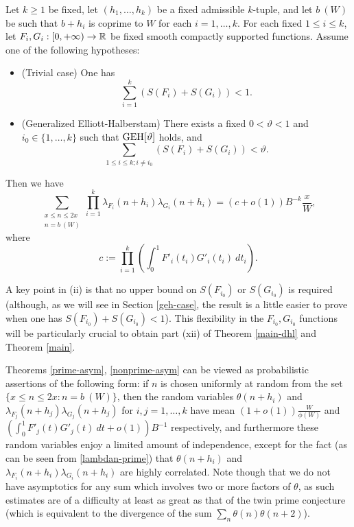 \begin{theorem}\label{nonprime-asym}  Let $k \geq 1$ be fixed, let $(h_1,\dots,h_k)$ be a fixed admissible $k$-tuple, and let $b\ (W)$ be such that $b+h_i$ is coprime to $W$ for each $i=1,\dots,k$.  For each fixed $1 \leq i \leq k$, let $F_{i}, G_{i}: [0,+\infty) \to \mathbb{R}$ be fixed smooth compactly supported functions.  Assume one of the following hypotheses:
\begin{itemize}
\item[(i)]  (Trivial case)  One has
\begin{equation}\label{easy-upper}
\sum_{i=1}^k ( S(F_i) + S(G_i) ) < 1.
\end{equation}
\item[(ii)]  (Generalized Elliott-Halberstam) There exists a fixed $0 < \vartheta < 1$ and $i_0 \in \{1,\dots,k\}$ such that $\operatorname*{GEH}[\vartheta]$ holds, and
\begin{equation}\label{eh-upper}
\sum_{1 \leq i \leq k; i \neq i_0} ( S(F_{i}) + S(G_{i}) ) < \vartheta.
\end{equation}
\end{itemize}
Then we have
\begin{equation}\label{lflg}
 \sum_{\substack{x \leq n \leq 2x\\ n = b\ (W)}} \prod_{i=1}^k \lambda_{F_{i}}(n+h_{i}) \lambda_{G_{i}}(n+h_{i}) =
(c+o(1)) B^{-k} \frac{x}{W},
\end{equation}
where
\begin{equation}\label{c-def}
 c := \prod_{i=1}^k \left(\int_0^1 F'_i(t_i) G'_i(t_i)\ dt_i\right).
\end{equation}
\end{theorem}

A key point in (ii) is that no upper bound on $S(F_{i_0})$ or $S(G_{i_0})$ is required (although, as we will see in Section \ref{geh-case}, the result is a little easier to prove when one has $S(F_{i_0})+S(G_{i_0}) < 1$).  This flexibility in the $F_{i_0}, G_{i_0}$ functions will be particularly crucial to obtain part (xii) of Theorem \ref{main-dhl} and Theorem \ref{main}.

\begin{remark}  Theorems \ref{prime-asym}, \ref{nonprime-asym} can be viewed as probabilistic assertions of the following form: if $n$ is chosen uniformly at random from the set $\{ x \leq n \leq 2x: n = b\ (W)\}$, then the random variables $\theta(n+h_i)$ and $\lambda_{F_j}(n+h_j) \lambda_{G_j}(n+h_j)$ for $i,j=1,\dots,k$ have mean $(1+o(1)) \frac{W}{\phi(W)}$ and $(\int_0^1 F'_j(t) G'_j(t)\ dt + o(1)) B^{-1}$ respectively, and furthermore these random variables enjoy a limited amount of independence, except for the fact (as can be seen from \eqref{lambdan-prime}) that $\theta(n+h_i)$ and $\lambda_{F_i}(n+h_i) \lambda_{G_i}(n+h_i)$ are highly correlated.  Note though that we do not have asymptotics for any sum which involves two or more factors of $\theta$, as such estimates are of a difficulty at least as great as that of the twin prime conjecture (which is equivalent to the divergence of the sum $\sum_n \theta(n) \theta(n+2)$).
\end{remark}



